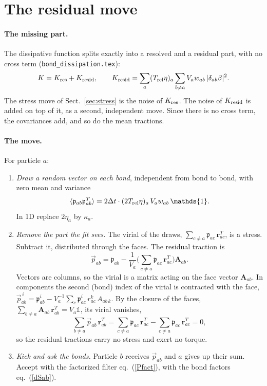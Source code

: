 \documentclass[11pt,aps,preprint,nofootinbib,superscriptaddress,tightenlines]{revtex4-2}
\def\st{\begin{equation}}
\def\stp{\end{equation}}
\def\Eq#1{eq.~(\ref{#1})}
\def\Sect#1{Sect.~\ref{#1}}
\newcommand{\one}{\mathds{1}}
\newcommand{\avg}[1]{\langle #1\rangle}
\let\oldparagraph\paragraph
\renewcommand{\paragraph}{\par\bigskip\oldparagraph}
\begin{document}
\section{The residual move}
\label{sec:resid}

\paragraph{The missing part.}  The dissipative function splits exactly into a
resolved and a residual part, with no cross term
(\texttt{bond\_dissipation.tex}):
\st
K=K_{\rm res}+K_{\rm resid},\qquad
K_{\rm resid}=\sum_a(T_{\rm rel}\eta)_a\sum_{b\neq a}V_aw_{ab}\,|\delta_{ab}\beta|^2 .
\stp
The stress move of \Sect{sec:stress} is the noise of $K_{\rm res}$.  The noise of
$K_{\rm resid}$ is added on top of it, as a second, independent move.  Since there
is no cross term, the covariances add, and so do the mean tractions.

\paragraph{The move.}  For particle $a$:
\begin{enumerate}
\item \emph{Draw a random vector on each bond}, independent from bond to bond,
  with zero mean and variance
  \st
  \avg{\mathfrak p_{ab}\mathfrak p_{ab}^T}=2\Delta t\cdot (2T_{\rm rel}\eta)_a\,V_aw_{ab}\,\one .
  \stp
  In 1D replace $2\eta_a$ by $\kappa_a$.
\item \emph{Remove the part the fit sees.}  The virial of the draws,
  $\sum_{c\neq a}\mathfrak p_{ac}\,\bm r_{ac}^T$, is a stress.  Subtract it,
  distributed through the faces.  The residual traction is
  \st
  \vec p_{ab}=\mathfrak p_{ab}-\frac1{V_a}\Big(\sum_{c\neq a}\mathfrak p_{ac}\,\bm r_{ac}^T\Big)\bm A_{ab} .
  \label{tauab}
  \stp
  Vectors are columns, so the virial is a matrix acting on the face vector
  $\bm A_{ab}$.  In components the second (bond) index of the virial is
  contracted with the face,
  $\vec p^{\,i}_{ab}=\mathfrak p^i_{ab}-V_a^{-1}\sum_c\mathfrak p^i_{ac}\,r^k_{ac}\,A_{ab\,k}$.
  By the closure of the faces, $\sum_{b\neq a}\bm A_{ab}\,\bm r_{ab}^T=V_a\one$,
  its virial vanishes,
  \st
  \sum_{b\neq a}\vec p_{ab}\,\bm r_{ab}^T
  =\sum_{c\neq a}\mathfrak p_{ac}\,\bm r_{ac}^T-\sum_{c\neq a}\mathfrak p_{ac}\,\bm r_{ac}^T=0 ,
  \stp
  so the residual tractions carry no stress and exert no torque.
\item \emph{Kick and ask the bonds.}  Particle $b$ receives $\vec p_{ab}$ and $a$
  gives up their sum.  Accept with the factorized filter \Eq{Pfact}, with the
  bond factors \Eq{dSab}.
\end{enumerate}
\end{document}
